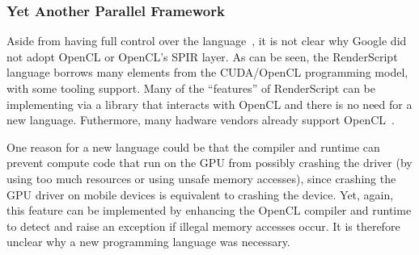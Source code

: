 \subsubsection{Yet Another Parallel Framework}

Aside from having full control over the language~\cite{googlelockin}, it is not clear why
 Google did not adopt OpenCL or OpenCL's SPIR layer.
As can be seen, the RenderScript language borrows many elements from the CUDA/OpenCL 
 programming model, with some tooling support.
Many of the ``features'' of RenderScript can be implementing via a library that 
 interacts with OpenCL and there is no need for a new language.
Futhermore, many hadware vendors already support OpenCL~\cite{OpenCL:Android}.

One reason for a new language could be that the compiler and runtime can prevent compute code that run on the GPU from
 possibly crashing the driver (by using too much resources or using unsafe memory accesses),
 since crashing the GPU driver on mobile devices is equivalent to crashing the device.
Yet, again, this feature can be implemented by enhancing the OpenCL compiler and runtime to detect
 and raise an exception if illegal memory accesses occur.
It is therefore unclear why a new programming language was necessary.
